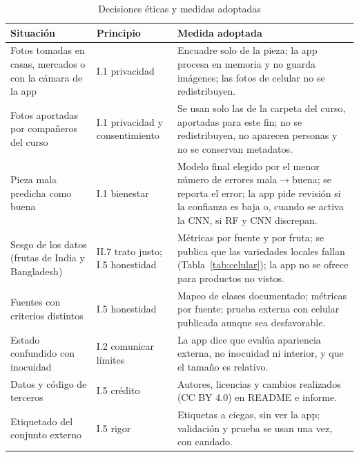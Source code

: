 \documentclass[conference]{IEEEtran}
\newcommand{\mb}{mala$\to$buena}
\begin{document}
\begin{table}[t]
\caption{Decisiones éticas y medidas adoptadas}
\label{tab:etica}
\centering
\scriptsize
\setlength{\tabcolsep}{3pt}
\begin{tabular}{@{}>{\raggedright\arraybackslash}p{}>{\raggedright\arraybackslash}p{}>{\raggedright\arraybackslash}p{}@{}}
\toprule
Situación & Principio & Medida adoptada\\
\midrule
Fotos tomadas en casas, mercados o con la cámara de la app & I.1 privacidad & Encuadre solo de la pieza; la app procesa en memoria y no guarda imágenes; las fotos de celular no se redistribuyen.\\
Fotos aportadas por compañeros del curso & I.1 privacidad y consentimiento & Se usan solo las de la carpeta del curso, aportadas para este fin; no se redistribuyen, no aparecen personas y no se conservan metadatos.\\
Pieza mala predicha como buena & I.1 bienestar & Modelo final elegido por el menor número de errores \mb; se reporta el error; la app pide revisión si la confianza es baja o, cuando se activa la CNN, si RF y CNN discrepan.\\
Sesgo de los datos (frutas de India y Bangladesh) & II.7 trato justo; I.5 honestidad & Métricas por fuente y por fruta; se publica que las variedades locales fallan (Tabla~\ref{tab:celular}); la app no se ofrece para productos no vistos.\\
Fuentes con criterios distintos & I.5 honestidad & Mapeo de clases documentado; métricas por fuente; prueba externa con celular publicada aunque sea desfavorable.\\
Estado confundido con inocuidad & I.2 comunicar límites & La app dice que evalúa apariencia externa, no inocuidad ni interior, y que el tamaño es relativo.\\
Datos y código de terceros & I.5 crédito & Autores, licencias y cambios realizados (CC BY 4.0) en README e informe.\\
Etiquetado del conjunto externo & I.5 rigor & Etiquetas a ciegas, sin ver la app; validación y prueba se usan una vez, con candado.\\
\bottomrule
\end{tabular}
\end{table}
\end{document}

